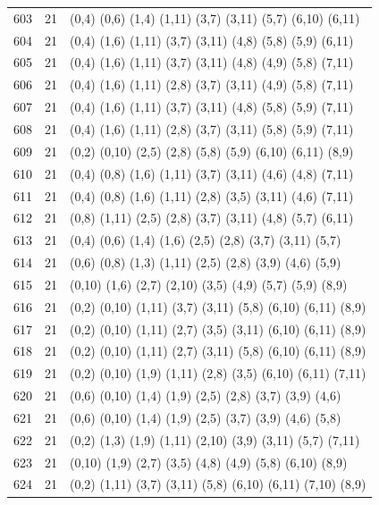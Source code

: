 \begin{appendix}
{\begin{longtable}{lll}
603& 21 & (0,4)   (0,6)  (1,4)  (1,11)  (3,7)   (3,11)  (5,7)   (6,10)  (6,11)\\
604& 21 & (0,4)   (1,6)  (1,11) (3,7)   (3,11)  (4,8)   (5,8)   (5,9)   (6,11)\\
605& 21 & (0,4)   (1,6)  (1,11) (3,7)   (3,11)  (4,8)   (4,9)   (5,8)   (7,11)\\
606& 21 & (0,4)   (1,6)  (1,11) (2,8)   (3,7)   (3,11)  (4,9)   (5,8)   (7,11)\\
607& 21 & (0,4)   (1,6)  (1,11) (3,7)   (3,11)  (4,8)   (5,8)   (5,9)   (7,11)\\
608& 21 & (0,4)   (1,6)  (1,11) (2,8)   (3,7)   (3,11)  (5,8)   (5,9)   (7,11)\\
609& 21 & (0,2)   (0,10) (2,5)  (2,8)   (5,8)   (5,9)   (6,10)  (6,11)  (8,9)\\
610& 21 & (0,4)   (0,8)  (1,6)  (1,11)  (3,7)   (3,11)  (4,6)   (4,8)   (7,11)\\
611& 21 & (0,4)   (0,8)  (1,6)  (1,11)  (2,8)   (3,5)   (3,11)  (4,6)   (7,11)\\
612& 21 & (0,8)   (1,11) (2,5)  (2,8)   (3,7)   (3,11)  (4,8)   (5,7)   (6,11)\\
613& 21 & (0,4)   (0,6)  (1,4)  (1,6)   (2,5)   (2,8)   (3,7)   (3,11)  (5,7)\\
614& 21 & (0,6)   (0,8)  (1,3)  (1,11)  (2,5)   (2,8)   (3,9)   (4,6)   (5,9)\\
615& 21 & (0,10)  (1,6)  (2,7)  (2,10)  (3,5)   (4,9)   (5,7)   (5,9)   (8,9)\\
616& 21 & (0,2)   (0,10) (1,11) (3,7)   (3,11)  (5,8)   (6,10)  (6,11)  (8,9)\\
617& 21 & (0,2)   (0,10) (1,11) (2,7)   (3,5)   (3,11)  (6,10)  (6,11)  (8,9)\\
618& 21 & (0,2)   (0,10) (1,11) (2,7)   (3,11)  (5,8)   (6,10)  (6,11)  (8,9)\\
619& 21 & (0,2)   (0,10) (1,9)  (1,11)  (2,8)   (3,5)   (6,10)  (6,11)  (7,11)\\
620& 21 & (0,6)   (0,10) (1,4)  (1,9)   (2,5)   (2,8)   (3,7)   (3,9)   (4,6)\\
621& 21 & (0,6)   (0,10) (1,4)  (1,9)   (2,5)   (3,7)   (3,9)   (4,6)   (5,8)\\
622& 21 & (0,2)   (1,3)  (1,9)  (1,11)  (2,10)  (3,9)   (3,11)  (5,7)   (7,11)\\
623& 21 & (0,10)  (1,9)  (2,7)  (3,5)   (4,8)   (4,9)   (5,8)   (6,10)  (8,9)\\
624& 21 & (0,2)   (1,11) (3,7)  (3,11)  (5,8)   (6,10)  (6,11)  (7,10)  (8,9)\\

\end{longtable}}
\end{appendix}
